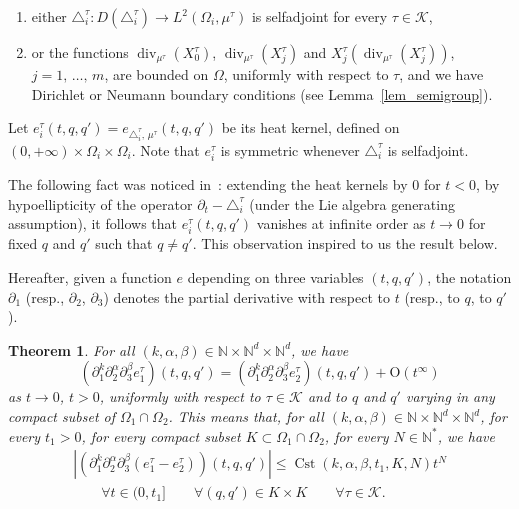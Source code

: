 \documentclass[10pt]{amsart}
\newtheorem{theo}{Theorem}[section]
\theoremstyle{definition}\newtheorem{defi}[theo]{Definition}\newtheorem{rema}[theo]{Remark}\newtheorem{exam}[theo]{Example}\newtheorem{exem}[theo]{Example}\newtheorem{nota}[theo]{Notation}
\newcommand*\N{\mathbb{N}}
\newcommand{\calK}{\mathcal{K}}
\newcommand{\rmO}{\mathrm{O}}
\DeclareMathOperator{\Cst}{Cst}
\DeclareMathOperator{\divl}{div}
\renewcommand{\leq}{\leqslant}
\newcommand*{\Allphenumi}{\renewcommand*{\theenumi}{{\Alph{enumi}$_\tau$}}}
\let\oldforall\forall
\renewcommand*{\forall}{\mathrel{\oldforall}}
\begin{document}
\begin{enumerate}\Allphenumi
\item  either $\triangle_i^{\tau} :D(\triangle^{\tau}_i)\rightarrow L^2(\Omega_i,\mu^\tau)$ is selfadjoint for every $\tau\in\calK$,\label{caseAtau}
\item  or the functions $\divl_{\mu^\tau}(X_0^\tau)$, $\divl_{\mu^{\tau}}(X_j^\tau)$ and $X_j^\tau(\divl_{\mu^{\tau}}(X_j^\tau))$, $j=1,\,\ldots,\,m$, are bounded on $\Omega$, uniformly with respect to $\tau$, and we have Dirichlet or Neumann boundary conditions (see Lemma~\ref{lem_semigroup}).\label{caseBtau}
\end{enumerate}

Let $e^\tau_i(t,q,q')=e_{\triangle^\tau_i,\,\mu^\tau}(t,q,q')$ be its heat kernel, defined on $(0,+\infty) \times\Omega_i\times\Omega_i$. Note that $e^\tau_i$ is symmetric whenever $\triangle^\tau_i$ is selfadjoint.

The following fact was noticed in~\cite{Je-Sa-86}: extending the heat kernels by $0$ for $t<0$, by hypoellipticity of the operator $\partial_t-\triangle^\tau_i$ (under the Lie algebra generating assumption), it follows that $e^\tau_i(t,q,q')$ vanishes at infinite order as $t\rightarrow 0$ for fixed $q$ and $q'$ such that $q\neq q'$. This observation inspired to us the result below.

Hereafter, given a function $e$ depending on three variables $(t,q,q')$, the notation $\partial_1$ (resp., $\partial_2$, $\partial_3$) denotes the partial derivative with respect to $t$ (resp., to $q$, to $q'$).


\begin{theo}\label{theo:localheat}
For all $(k,\alpha,\beta)\in \N\times\N^d\times\N^d$, we have
\[
\left(\partial_1^k \partial_2^\alpha \partial_3^\beta e^\tau_1\right) (t,q,q') = \left(\partial_1^k \partial_2^\alpha \partial_3^\beta e^\tau_2\right) (t,q,q') + \rmO(t^\infty)
\]
as $t\rightarrow 0$, $t>0$, uniformly with respect to $\tau\in\calK$ and to $q$ and $q'$ varying in any compact subset of $\Omega_1\cap \Omega_2$. This means that, for all $(k,\alpha,\beta)\in \N\times\N^d\times\N^d$, for every $t_1>0$, for every compact subset $K\subset\Omega_1\cap\Omega_2$, for every $N\in\N^*$, we have
\begin{multline*}
\left\vert \left(\partial_1^k \partial_2^\alpha \partial_3^\beta \left(e^\tau_1 - e^\tau_2\right)\right) (t,q,q') \right\vert \leq \Cst(k,\alpha,\beta,t_1,K,N) t^N \\
\qquad \forall t\in(0,t_1]\qquad\forall (q,q')\in K\times K\qquad\forall \tau\in\calK.
\end{multline*}
\end{theo}
\end{document}
